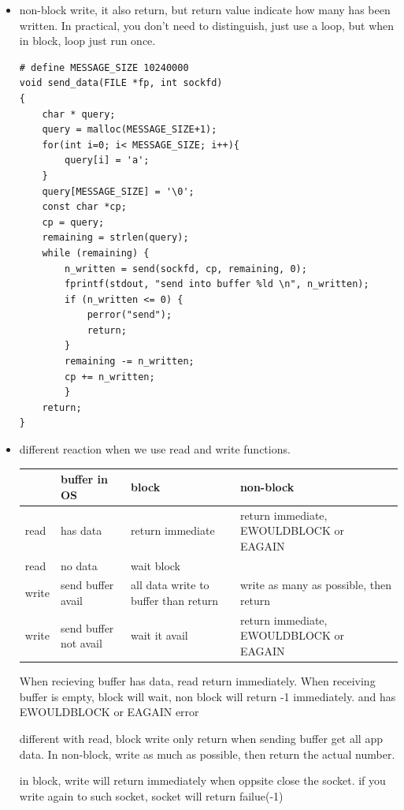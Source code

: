 \documentclass[a4paper,11pt,twoside]{book}
\begin{document}
\begin{itemize}
\item non-block write, it also return, but return value indicate how many has been written. In practical, you don't need to distinguish, just use a loop, but when in block, loop just run once.

\begin{lstlisting}[numbers=none]
# define MESSAGE_SIZE 10240000
void send_data(FILE *fp, int sockfd)
{
	char * query;
	query = malloc(MESSAGE_SIZE+1);
	for(int i=0; i< MESSAGE_SIZE; i++){
		query[i] = 'a';
	}
	query[MESSAGE_SIZE] = '\0';
	const char *cp;
	cp = query;
	remaining = strlen(query);
	while (remaining) {
		n_written = send(sockfd, cp, remaining, 0);
		fprintf(stdout, "send into buffer %ld \n", n_written);
		if (n_written <= 0) {
			perror("send");
			return;
		}
		remaining -= n_written;
		cp += n_written;
		}
	return;
}
\end{lstlisting}

	\item different reaction when we use read and write functions. 
 
\begin{tabular}{| p{} |p{}|p{}|p{}|}
	\hline
	& buffer in OS & block  & non-block  \\
	\hline
read	&  has data & return immediate & return immediate, EWOULDBLOCK or EAGAIN  \\
	\hline
read	& no data & wait block &  \\
	\hline
write	& send buffer avail & all data write to buffer than return & write as many as possible, then return  \\
	\hline
write	& send buffer not avail  & wait it avail & return immediate, EWOULDBLOCK or EAGAIN \\
	\hline
\end{tabular}

When recieving buffer has data, read return immediately. When receiving buffer is empty, block will wait, non block will return -1 immediately. and has EWOULDBLOCK or  EAGAIN error


different with read, block write only return when sending buffer get all app data. In non-block, write as much as possible, then return the actual number. 


in block, write will return immediately when oppsite close the socket.  if you write again to such socket, socket will return failue(-1)


\end{itemize}
\end{document}
